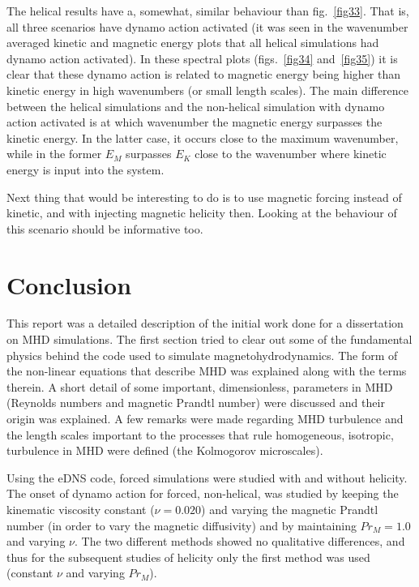 \documentclass[a4paper,12pt]{article}
\begin{document}
The helical results have a, somewhat, similar behaviour than fig.~\ref{fig33}. That is, all three scenarios have dynamo action activated (it was seen in the wavenumber averaged kinetic and magnetic energy plots that all helical simulations had dynamo action activated). In these spectral plots (figs.~\ref{fig34} and~\ref{fig35}) it is clear that these dynamo action is related to magnetic energy being higher than kinetic energy in high wavenumbers (or small length scales). The main difference between the helical simulations and the non-helical simulation with dynamo action activated is at which wavenumber the magnetic energy surpasses the kinetic energy. In the latter case, it occurs close to the maximum wavenumber, while in the former $E_M$ surpasses $E_K$ close to the wavenumber where kinetic energy is input into the system. 

Next thing that would be interesting to do is to use magnetic forcing instead of kinetic, and with injecting magnetic helicity then. Looking at the behaviour of this scenario should be informative too. 

\section{Conclusion}

This report was a detailed description of the initial work done for a dissertation on MHD simulations. The first section tried to clear out some of the fundamental physics behind the code used to simulate magnetohydrodynamics. The form of the non-linear equations that describe MHD was explained along with the terms therein. A short detail of some important, dimensionless, parameters in MHD (Reynolds numbers and magnetic Prandtl number) were discussed and their origin was explained. A few remarks were made regarding MHD turbulence and the length scales important to the processes that rule homogeneous, isotropic, turbulence in MHD were defined (the Kolmogorov microscales). 

Using the eDNS code, forced simulations were studied with and without helicity. The onset of dynamo action for forced, non-helical, was studied by keeping the kinematic viscosity constant ($\nu = 0.020$) and varying the magnetic Prandtl number (in order to vary the magnetic diffusivity) and by maintaining $Pr_M=1.0$ and varying $\nu$. The two different methods showed no qualitative differences, and thus for the subsequent studies of helicity only the first method was used (constant $\nu$ and varying $Pr_M$).
\end{document}
